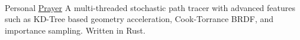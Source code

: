 \begin{cventries}
{    }\\\vspace{1em}
    \cventry
    {Personal} %
    {\href{https://github.com/CRefice/prayer}{Prayer\hspace{0.15cm}\faGithubSquare}} %
    {} %
    {} %
    {
        A multi-threaded stochastic path tracer with advanced features such as KD-Tree based geometry acceleration, Cook-Torrance BRDF, and importance sampling. Written in Rust.
    }
\end{cventries}
